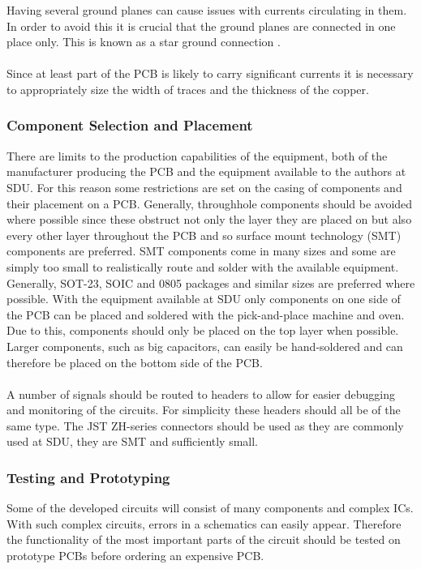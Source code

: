 Having several ground planes can cause issues with currents circulating in them.
In order to avoid this it is crucial that the ground planes are connected in one place only.
This is known as a star ground connection \cite{starground}.
\\~\\
Since at least part of the PCB is likely to carry significant currents it is necessary to appropriately size the width of traces and the thickness of the copper.

\subsubsection{Component Selection and Placement} %
\label{ssub:component_case_selection_and_placement}
There are limits to the production capabilities of the equipment, both of the manufacturer producing the PCB and the equipment available to the authors at SDU.
For this reason some restrictions are set on the casing of components and their placement on a PCB.
Generally, throughhole components should be avoided where possible since these obstruct not only the layer they are placed on but also every other layer throughout the PCB and so surface mount technology (SMT) components are preferred.
SMT components come in many sizes and some are simply too small to realistically route and solder with the available equipment.
Generally, SOT-23, SOIC and 0805 packages and similar sizes are preferred where possible.
With the equipment available at SDU only components on one side of the PCB can be placed and soldered with the pick-and-place machine and oven.
Due to this, components should only be placed on the top layer when possible.
Larger components, such as big capacitors, can easily be hand-soldered and can therefore be placed on the bottom side of the PCB.
\\~\\
A number of signals should be routed to headers to allow for easier debugging and monitoring of the circuits.
For simplicity these headers should all be of the same type. 
The JST ZH-series connectors should be used as they are commonly used at SDU, they are SMT and sufficiently small. 


\subsubsection{Testing and Prototyping} %
Some of the developed circuits will consist of many components and complex ICs.
With such complex circuits, errors in a schematics can easily appear.
Therefore the functionality of the most important parts of the circuit should be tested on prototype PCBs before ordering an expensive PCB.

